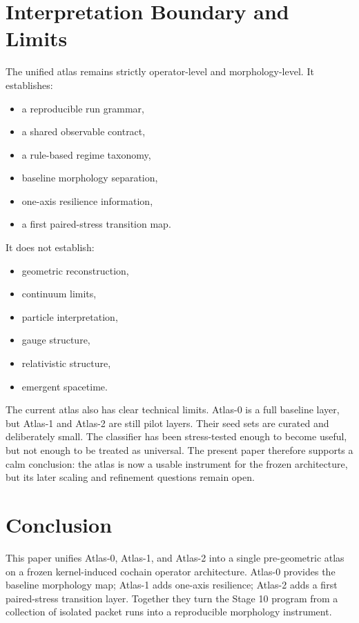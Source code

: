 \documentclass[11pt]{article}
\begin{document}
\section{Interpretation Boundary and Limits}
The unified atlas remains strictly operator-level and morphology-level. It establishes:
\begin{itemize}
\item a reproducible run grammar,
\item a shared observable contract,
\item a rule-based regime taxonomy,
\item baseline morphology separation,
\item one-axis resilience information,
\item a first paired-stress transition map.
\end{itemize}

It does not establish:
\begin{itemize}
\item geometric reconstruction,
\item continuum limits,
\item particle interpretation,
\item gauge structure,
\item relativistic structure,
\item emergent spacetime.
\end{itemize}

The current atlas also has clear technical limits. Atlas-0 is a full baseline layer, but Atlas-1 and Atlas-2 are still pilot layers. Their seed sets are curated and deliberately small. The classifier has been stress-tested enough to become useful, but not enough to be treated as universal. The present paper therefore supports a calm conclusion: the atlas is now a usable instrument for the frozen architecture, but its later scaling and refinement questions remain open.

\section{Conclusion}
This paper unifies Atlas-0, Atlas-1, and Atlas-2 into a single pre-geometric atlas on a frozen kernel-induced cochain operator architecture. Atlas-0 provides the baseline morphology map; Atlas-1 adds one-axis resilience; Atlas-2 adds a first paired-stress transition layer. Together they turn the Stage 10 program from a collection of isolated packet runs into a reproducible morphology instrument.
\end{document}
